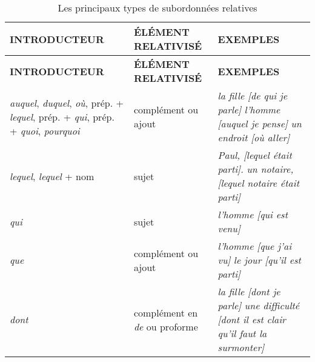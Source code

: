 \documentclass[UTF8]{report}
\begin{document}
\begin{table}[H]
    \centering
    \small
    \begin{longtable}{|>{\RaggedRight}m{4cm}|m{3cm}|m{7cm}|}
    \hline
    \rowcolor{cyan!20}
    \textbf{INTRODUCTEUR} & \textbf{ÉLÉMENT RELATIVISÉ} & \textbf{EXEMPLES} \\
    \hline
    \endfirsthead
    \hline
    \rowcolor{cyan!20}
    \textbf{INTRODUCTEUR} & \textbf{ÉLÉMENT RELATIVISÉ} & \textbf{EXEMPLES} \\
    \hline
    \endhead
    \hline
    \endfoot
    \hline
    \endlastfoot
    
    \textit{auquel}, \textit{duquel}, \textit{où}, prép. + \textit{lequel}, prép. + \textit{qui}, prép. + \textit{quoi}, \textit{pourquoi} & complément \newline ou ajout & \textit{la fille [de qui je parle]} \newline \textit{l'homme [auquel je pense]} \newline \textit{un endroit [où aller]} \\
    \hline
    \textit{lequel}, \textit{lequel} + nom & sujet & \textit{Paul, [lequel était parti].} \newline \textit{un notaire, [lequel notaire était parti]} \\
    \hline
    \textit{qui} & sujet & \textit{l'homme [qui est venu]} \\
    \hline
    \textit{que} & complément \newline ou ajout & \textit{l'homme [que j'ai vu]} \newline \textit{le jour [qu'il est parti]} \\
    \hline
    \textit{dont} & complément en \textit{de} \newline ou proforme & \textit{la fille [dont je parle]} \newline \textit{une difficulté [dont il est clair qu'il faut la surmonter]} \\
    \hline
    \end{longtable}
    \caption{Les principaux types de subordonnées relatives}
\end{table}
\end{document}
